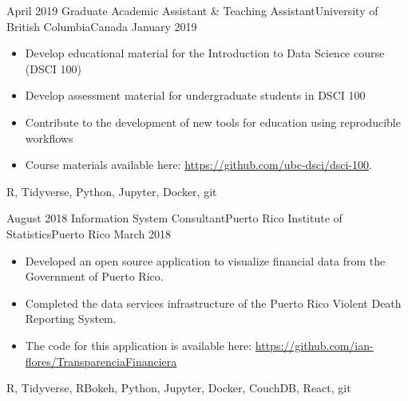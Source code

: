 %
%
%
\begin{experiences}

  \experience
    {April 2019}   {Graduate Academic Assistant \& Teaching Assistant}{University of British Columbia}{Canada}
    {January 2019} {
                      \begin{itemize}
                        \item Develop educational material for the Introduction to Data Science course (DSCI 100)
                        \item Develop assessment material for undergraduate students in DSCI 100
                        \item Contribute to the development of new tools for education using reproducible workflows
                        \item Course materials available here: \href{https://github.com/ubc-dsci/dsci-100}{https://github.com/ubc-dsci/dsci-100}.
                      \end{itemize}
                    }
                    {R, Tidyverse, Python, Jupyter, Docker, git}
  \emptySeparator
  
  \experience
    {August 2018}   {Information System Consultant}{Puerto Rico Institute of Statistics}{Puerto Rico}
    {March 2018} {
                      \begin{itemize}
                        \item Developed an open source application to visualize financial data from the Government of Puerto Rico.                         
                        \item Completed the data services infrastructure of the Puerto Rico Violent Death Reporting System.
                        \item The code for this application is available here: \newline
                        \href{https://github.com/ian-flores/TransparenciaFinanciera}{https://github.com/ian-flores/TransparenciaFinanciera}
                      \end{itemize}
                    }
                    {R, Tidyverse, RBokeh, Python, Jupyter, Docker, CouchDB, React, git}
  \emptySeparator
  

\end{experiences}
